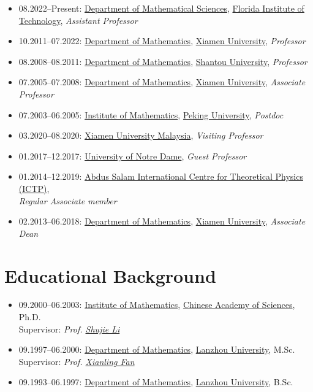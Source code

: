 \documentclass[12pt]{amsproc}
\begin{document}
\begin{itemize}
\item 08.2022--Present:  \href{https://www.fit.edu/mathematical-sciences/}{Department of Mathematical Sciences}, \href{http://www.fit.edu}{Florida Institute of Technology}, \emph{Assistant Professor}
\item 10.2011--07.2022: \href{http://math.xmu.edu.cn}{Department of Mathematics}, \href{http://www.xmu.edu.cn}{Xiamen
University}, \emph{Professor}
\item 08.2008--08.2011: \href{http://math.stu.edu.cn}{Department of Mathematics}, \href{http://www.stu.edu.cn}{Shantou University}, \emph{Professor}
\item 07.2005--07.2008: \href{http://math.xmu.edu.cn}{Department of Mathematics}, \href{http://www.xmu.edu.cn}{Xiamen
University}, \emph{Associate Professor}
\item 07.2003--06.2005: \href{https://www.math.pku.edu.cn/xygk/xssys/sxyjs1/69260.htm}{Institute of Mathematics}, \href{http://www.pku.edu.cn}{Peking
University}, \emph{Postdoc}
\end{itemize}\medskip

\begin{itemize}
\item 03.2020--08.2020: \href{http://www.xmu.edu.my}{Xiamen University
Malaysia}, \emph{Visiting Professor}
\item 01.2017--12.2017: \href{http://www.nd.edu}{University of Notre Dame}, \emph{Guest Professor}
\item 01.2014--12.2019: \href{http://www.ictp.it}{Abdus Salam International Centre for Theoretical Physics (ICTP)},\\
\emph{Regular Associate member}
\item 02.2013--06.2018: \href{http://math.xmu.edu.cn}{Department of Mathematics}, \href{http://www.xmu.edu.cn}{Xiamen
University}, \emph{Associate Dean}

\end{itemize}

\section{Educational Background}

\begin{itemize}
\item 09.2000--06.2003: \href{http://www.amss.ac.cn}{Institute of Mathematics}, \href{http://www.cas.ac.cn}{Chinese Academy of
Sciences}, Ph.D.\\ Supervisor: \emph{Prof. \href{https://mathscinet.ams.org/mathscinet/search/author.html?mrauthid=226307}{Shujie Li}}
\item 09.1997--06.2000: \href{http://math.lzu.edu.cn}{Department of Mathematics}, \href{http://www.lzu.edu.cn}{Lanzhou
University}, M.Sc.\\ Supervisor: \emph{Prof. \href{https://mathscinet.ams.org/mathscinet/search/author.html?mrauthid=205096}{Xianling Fan}}
\item 09.1993--06.1997: \href{http://math.lzu.edu.cn}{Department of Mathematics}, \href{http://www.lzu.edu.cn}{Lanzhou
University}, B.Sc.
\end{itemize}
\end{document}
